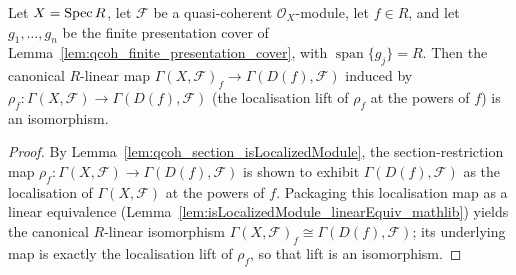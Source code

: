 \begin{lemma}\leanok
  \label{lem:qcoh_section_kernel_comparison}
  Let \(X = \operatorname{Spec} R\), let \(\mathcal{F}\) be a quasi-coherent \(\mathcal{O}_X\)-module, let \(f \in R\),
  and let \(g_1, \ldots, g_n\) be the finite presentation cover of
  Lemma~\ref{lem:qcoh_finite_presentation_cover}, with \(\operatorname{span}\{g_j\} = R\). Then the
  canonical \(R\)-linear map \(\Gamma(X, \mathcal{F})_f \to \Gamma(D(f), \mathcal{F})\) induced by
  \(\rho_f : \Gamma(X, \mathcal{F}) \to \Gamma(D(f), \mathcal{F})\) (the localisation lift of \(\rho_f\)
  at the powers of \(f\)) is an isomorphism.
\end{lemma}
\begin{proof}
    \leanok
  By Lemma~\ref{lem:qcoh_section_isLocalizedModule}, the
  section-restriction map \(\rho_f : \Gamma(X, \mathcal{F}) \to \Gamma(D(f), \mathcal{F})\) is shown to
  exhibit \(\Gamma(D(f), \mathcal{F})\) as the localisation of \(\Gamma(X, \mathcal{F})\) at the powers of
  \(f\). Packaging this localisation map as a linear equivalence
  (Lemma~\ref{lem:isLocalizedModule_linearEquiv_mathlib})
  yields the canonical \(R\)-linear isomorphism \(\Gamma(X, \mathcal{F})_f \cong \Gamma(D(f),
  \mathcal{F})\); its underlying map is exactly the localisation lift of \(\rho_f\), so that lift is an
  isomorphism.
\end{proof}

